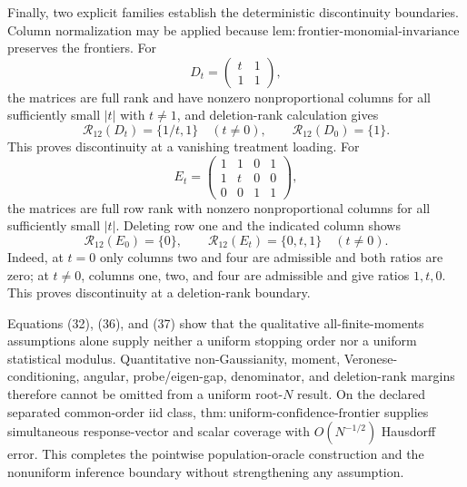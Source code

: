 Finally, two explicit families establish the deterministic discontinuity boundaries. Column normalization may be applied because \(\mathrm{lem{:}frontier\text{-}monomial\text{-}invariance}\) preserves the frontiers. For
\[
 D_t=\begin{pmatrix}t&1\\1&1\end{pmatrix},
\]
the matrices are full rank and have nonzero nonproportional columns for all sufficiently small \(|t|\) with \(t\ne1\), and deletion-rank calculation gives
\[
 \mathcal R_{12}(D_t)=\{1/t,1\}\quad(t\ne0),
 \qquad
 \mathcal R_{12}(D_0)=\{1\}. \tag{36}
\]
This proves discontinuity at a vanishing treatment loading. For
\[
 E_t=
 \begin{pmatrix}
 1&1&0&1\\
 1&t&0&0\\
 0&0&1&1
 \end{pmatrix},
\]
the matrices are full row rank with nonzero nonproportional columns for all sufficiently small \(|t|\). Deleting row one and the indicated column shows
\[
 \mathcal R_{12}(E_0)=\{0\},
 \qquad
 \mathcal R_{12}(E_t)=\{0,t,1\}\quad(t\ne0). \tag{37}
\]
Indeed, at \(t=0\) only columns two and four are admissible and both ratios are zero; at \(t\ne0\), columns one, two, and four are admissible and give ratios \(1,t,0\). This proves discontinuity at a deletion-rank boundary.

Equations (32), (36), and (37) show that the qualitative all-finite-moments assumptions alone supply neither a uniform stopping order nor a uniform statistical modulus. Quantitative non-Gaussianity, moment, Veronese-conditioning, angular, probe/eigen-gap, denominator, and deletion-rank margins therefore cannot be omitted from a uniform root-\(N\) result. On the declared separated common-order iid class, \(\mathrm{thm{:}uniform\text{-}confidence\text{-}frontier}\) supplies simultaneous response-vector and scalar coverage with \(O(N^{-1/2})\) Hausdorff error. This completes the pointwise population-oracle construction and the nonuniform inference boundary without strengthening any assumption.